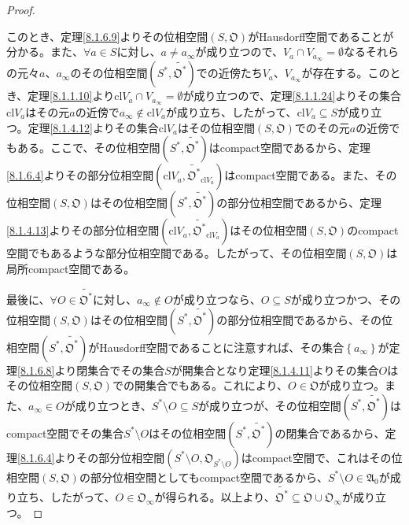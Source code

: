 \documentclass[dvipdfmx]{jsarticle}
\begin{document}
\begin{proof}
\begin{itemize}
\end{itemize}
このとき、定理\ref{8.1.6.9}よりその位相空間$\left( S,\mathfrak{O} \right)$がHausdorff空間であることが分かる。また、$\forall a \in S$に対し、$a \neq a_{\infty}$が成り立つので、$V_{a} \cap V_{a_{\infty}} = \emptyset$なるそれらの元々$a$、$a_{\infty}$のその位相空間$\left( S^{*},\widetilde{\mathfrak{O}^{*}} \right)$での近傍たち$V_{a}$、$V_{a_{\infty}}$が存在する。このとき、定理\ref{8.1.1.10}より${\mathrm{cl}}V_{a} \cap V_{a_{\infty}} = \emptyset$が成り立つので、定理\ref{8.1.1.24}よりその集合${\mathrm{cl}}V_{a}$はその元$a$の近傍で$a_{\infty} \notin {\mathrm{cl}}V_{a}$が成り立ち、したがって、${\mathrm{cl}}V_{a} \subseteq S$が成り立つ。定理\ref{8.1.4.12}よりその集合${\mathrm{cl}}V_{a}$はその位相空間$\left( S,\mathfrak{O} \right)$でのその元$a$の近傍でもある。ここで、その位相空間$\left( S^{*},\widetilde{\mathfrak{O}^{*}} \right)$はcompact空間であるから、定理\ref{8.1.6.4}よりその部分位相空間$\left( {\mathrm{cl}}V_{a},{\widetilde{\mathfrak{O}^{*}}}_{{\mathrm{cl}}V_{a}} \right)$はcompact空間である。また、その位相空間$\left( S,\mathfrak{O} \right)$はその位相空間$\left( S^{*},\widetilde{\mathfrak{O}^{*}} \right)$の部分位相空間であるから、定理\ref{8.1.4.13}よりその部分位相空間$\left( {\mathrm{cl}}V_{a},{\widetilde{\mathfrak{O}^{*}}}_{{\mathrm{cl}}V_{a}} \right)$はその位相空間$\left( S,\mathfrak{O} \right)$のcompact空間でもあるような部分位相空間である。したがって、その位相空間$\left( S,\mathfrak{O} \right)$は局所compact空間である。\par
最後に、$\forall O \in \widetilde{\mathfrak{O}^{*}}$に対し、$a_{\infty} \notin O$が成り立つなら、$O \subseteq S$が成り立つかつ、その位相空間$\left( S,\mathfrak{O} \right)$はその位相空間$\left( S^{*},\widetilde{\mathfrak{O}^{*}} \right)$の部分位相空間であるから、その位相空間$\left( S^{*},\widetilde{\mathfrak{O}^{*}} \right)$がHausdorff空間であることに注意すれば、その集合$\left\{ a_{\infty} \right\}$が定理\ref{8.1.6.8}より閉集合でその集合$S$が開集合となり定理\ref{8.1.4.11}よりその集合$O$はその位相空間$\left( S,\mathfrak{O} \right)$での開集合でもある。これにより、$O \in \mathfrak{O}$が成り立つ。また、$a_{\infty} \in O$が成り立つとき、$S^{*} \setminus O \subseteq S$が成り立つが、その位相空間$\left( S^{*},\widetilde{\mathfrak{O}^{*}} \right)$はcompact空間でその集合$S^{*} \setminus O$はその位相空間$\left( S^{*},\widetilde{\mathfrak{O}^{*}} \right)$の閉集合であるから、定理\ref{8.1.6.4}よりその部分位相空間$\left( S^{*} \setminus O,\mathfrak{O}_{S^{*} \setminus O} \right)$はcompact空間で、これはその位相空間$\left( S,\mathfrak{O} \right)$の部分位相空間としてもcompact空間であるから、$S^{*} \setminus O \in \mathfrak{A}_{0}$が成り立ち、したがって、$O \in \mathfrak{O}_{\infty}$が得られる。以上より、$\widetilde{\mathfrak{O}^{*}}\subseteq \mathfrak{O \cup}\mathfrak{O}_{\infty}$が成り立つ。\par

\end{proof}
\end{document}

